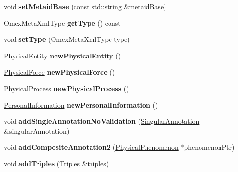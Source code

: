 \begin{DoxyCompactItemize}
void {\bfseries set\+Metaid\+Base} (const std\+::string \&metaid\+Base)
\item 
\mbox{\label{classomexmeta_1_1Editor_a68ade6a293061a98243a3b2853e55a4b}} 
Omex\+Meta\+Xml\+Type {\bfseries get\+Type} () const
\item 
\mbox{\label{classomexmeta_1_1Editor_a3e2c493ed5034a15e6915b7b649b58a3}} 
void {\bfseries set\+Type} (Omex\+Meta\+Xml\+Type type)
\item 
\mbox{\label{classomexmeta_1_1Editor_a245b2105c175892d1fddaf693fa9d636}} 
\hyperlink{classomexmeta_1_1PhysicalEntity}{Physical\+Entity} {\bfseries new\+Physical\+Entity} ()
\item 
\mbox{\label{classomexmeta_1_1Editor_a58d21ef09f3dc5a6a66dbafe34150695}} 
\hyperlink{classomexmeta_1_1PhysicalForce}{Physical\+Force} {\bfseries new\+Physical\+Force} ()
\item 
\mbox{\label{classomexmeta_1_1Editor_a2815d918736ee17d07306c5cf07c8ebf}} 
\hyperlink{classomexmeta_1_1PhysicalProcess}{Physical\+Process} {\bfseries new\+Physical\+Process} ()
\item 
\mbox{\label{classomexmeta_1_1Editor_a1943079ddbc4a4c6d896f51f360a11df}} 
\hyperlink{classomexmeta_1_1PersonalInformation}{Personal\+Information} {\bfseries new\+Personal\+Information} ()
\item 
\mbox{\label{classomexmeta_1_1Editor_a8fb3a19e8f64aeff2ac9b78c483843de}} 
void {\bfseries add\+Single\+Annotation\+No\+Validation} (\hyperlink{classomexmeta_1_1Triple}{Singular\+Annotation} \&singular\+Annotation)
\item 
\mbox{\label{classomexmeta_1_1Editor_ad05d04a31263f9c7cb8105e29fd9d158}} 
void {\bfseries add\+Composite\+Annotation2} (\hyperlink{classomexmeta_1_1PhysicalPhenomenon}{Physical\+Phenomenon} $\ast$phenomenon\+Ptr)
\item 
\mbox{\label{classomexmeta_1_1Editor_ace8ee873498fa72b63c0747775b729f5}} 
void {\bfseries add\+Triples} (\hyperlink{classomexmeta_1_1Triples}{Triples} \&triples)

\end{DoxyCompactItemize}
